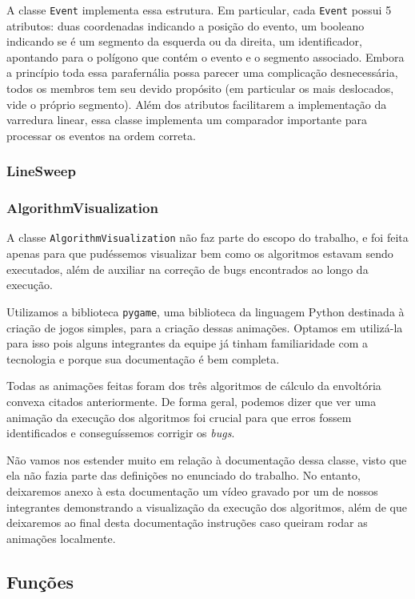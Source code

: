 \documentclass{article}
\begin{document}
A classe \texttt{Event} implementa essa estrutura. Em particular, cada \texttt{Event} possui 5 atributos: duas coordenadas indicando a posição do evento, um booleano indicando se é um segmento da esquerda ou da direita, um identificador, apontando para o polígono que contém o evento e o segmento associado. Embora a princípio toda essa parafernália possa parecer uma complicação desnecessária, todos os membros tem seu devido propósito (em particular os mais deslocados, vide o próprio segmento). Além dos atributos facilitarem a implementação da varredura linear, essa classe implementa um comparador importante para processar os eventos na ordem correta.

\subsubsection{LineSweep}

\subsubsection{AlgorithmVisualization}

A classe \texttt{AlgorithmVisualization} não faz parte do escopo do trabalho, e foi feita apenas para que pudéssemos visualizar bem como os algoritmos estavam sendo executados, além de auxiliar na correção de bugs encontrados ao longo da execução.

Utilizamos a biblioteca \texttt{pygame}, uma biblioteca da linguagem Python destinada à criação de jogos simples, para a criação dessas animações. Optamos em utilizá-la para isso pois alguns integrantes da equipe já tinham familiaridade com a tecnologia e porque sua documentação é bem completa.

Todas as animações feitas foram dos três algoritmos de cálculo da envoltória convexa citados anteriormente. De forma geral, podemos dizer que ver uma animação da execução dos algoritmos foi crucial para que erros fossem identificados e conseguíssemos corrigir os \textit{bugs}.

Não vamos nos estender muito em relação à documentação dessa classe, visto que ela não fazia parte das definições no enunciado do trabalho. No entanto, deixaremos anexo à esta documentação um vídeo gravado por um de nossos integrantes demonstrando a visualização da execução dos algoritmos, além de que deixaremos ao final desta documentação instruções caso queiram rodar as animações localmente.

\subsection{Funções}
\end{document}
